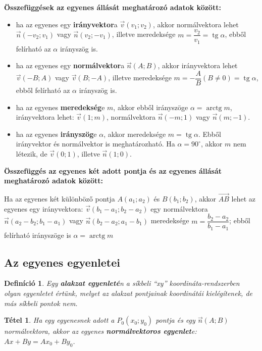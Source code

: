 \documentclass[12pt,a4paper]{article}
\newtheorem{theorem}{Tétel} [section]
\newtheorem{definition}{Definíció} [section]
\DeclareMathOperator{\tg}{tg}
\DeclareMathOperator{\arctg}{arctg}
\begin{document}
\textbf{Összefüggések az egyenes állását meghatározó adatok között:}
\begin{itemize}
\item ha az egyenes egy \textbf{irányvektor}a $\vec{v}(v_1;v_2)$, akkor normálvektora lehet $\vec{n}(-v_2;v_1)$ vagy $\vec{n}(v_2;-v_1)$, illetve meredeksége $m=\dfrac{v_2}{v_1}=\tg \alpha$, ebből felírható az $\alpha$ irányszög is.
\item ha az egyenes egy \textbf{normálvektor}a $\vec{n}(A;B)$, akkor irányvektora lehet $\vec{v}(-B;A)$ vagy $\vec{v}(B;-A)$, illetve meredeksége $m=-\dfrac{A}{B} (B\neq 0)=\tg \alpha$, ebből felírható az $\alpha$ irányszög is.
\item ha az egyenes \textbf{meredekség}e $m$, akkor ebből irányszöge $\alpha=\arctg m$, irányvektora lehet: $\vec{v}(1;m)$, normálvektora $\vec{n}(-m;1)$ vagy $\vec{n}(m;-1)$.
\item ha az egyenes \textbf{irányszög}e $\alpha$, akkor meredeksége $m=\tg \alpha$. Ebből irányvektor és normálvektor is meghatározható. Ha $\alpha=90^\circ$, akkor $m$ nem létezik, de $\vec{v}(0;1)$, illetve $\vec{n}(1;0)$.
\end{itemize}

\textbf{Összefüggés az egyenes két adott pontja és az egyenes állását meghatározó adatok között:}

Ha az egyenes két különböző pontja $A(a_1;a_2)$ és $B(b_1;b_2)$, akkor $\overrightarrow{AB}$ lehet az egyenes egy irányvektora: $\vec{v}(b_1-a_1;b_2-a_2)$ egy normálvektora $\vec{n}(a_2-b_2;b_1-a_1)$ vagy $\vec{n}(b_2-a_2;a_1-b_1)$  meredeksége $m=\dfrac{b_2-a_2}{b_1-a_1}$; ebből felírható irányszöge is $\alpha = \arctg m$

\subsection{Az egyenes egyenletei}

\begin{definition}
Egy \textbf{alakzat egyenleté}n a síkbeli ``xy'' koordináta-rendszerben olyan egyenletet értünk, melyet az alakzat pontjainak koordinátái kielégítenek, de más síkbeli pontok nem.
\end{definition}

\begin{theorem}
Ha egy egyenesnek adott a $P_0(x_0;y_0)$ pontja és egy $\vec{n}(A;B)$ normálvektora, akkor az egyenes \textbf{normálvektoros egyenlet}e: $Ax+By=Ax_0+By_0$.
\end{theorem}
\end{document}
